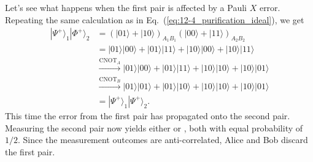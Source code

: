 Let's see what happens when the first pair is affected by a Pauli $X$ error.
Repeating the same calculation as in Eq.~(\ref{eq:12-4_purification_ideal}), we get
\begin{align}
    |\Psi^{+}\rangle_{1} |\Phi^{+}\rangle_{2} & = (|01\rangle + |10\rangle)_{A_1B_1} (|00\rangle + |11\rangle)_{A_2B_2} \nonumber\\
    & = |01\rangle |00\rangle + |01\rangle |11\rangle + |10\rangle |00\rangle +|10\rangle |11\rangle \nonumber\\
    & \stackrel{\mathrm{CNOT}_{A}}{\longrightarrow} |01\rangle|00\rangle+|01\rangle|11\rangle + |10\rangle|10\rangle+|10\rangle|01\rangle \\
    & \stackrel{\mathrm{CNOT}_{B}}{\longrightarrow} |01\rangle|01\rangle+|01\rangle|10\rangle+|10\rangle|10\rangle+|10\rangle|01\rangle \nonumber \\
    & = |\Psi^{+}\rangle_{1} |\Psi^{+}\rangle_{2} \nonumber.
    \label{eq:12-4_purification_error}
\end{align}
This time the error from the first pair has propagated onto the second pair.
Measuring the second pair now yields either  or , both with equal probability of $1/2$.
Since the measurement outcomes are anti-correlated, Alice and Bob discard the first pair.

